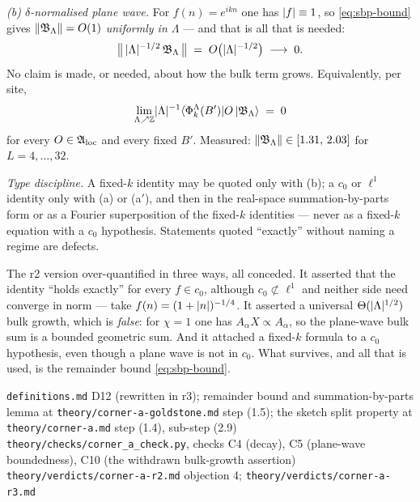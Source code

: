 \begin{definition}
\emph{(b) $\delta$-normalised plane wave.} For $f(n) = e^{ikn}$ one has
$\lvert f\rvert \equiv 1$, so \eqref{eq:sbp-bound} gives
$\Vert \mathfrak{B}_{\Lambda} \Vert = O(1)$ \emph{uniformly in $\Lambda$} --- and
that is all that is needed:
\begin{equation}
  \bigl\Vert \, \lvert \Lambda\rvert^{-1/2} \, \mathfrak{B}_{\Lambda} \, \bigr\Vert
  \;=\; O\bigl(\lvert \Lambda\rvert^{-1/2}\bigr) \;\longrightarrow\; 0 .
\end{equation}
No claim is made, or needed, about how the bulk term grows. Equivalently, per
site,
\begin{equation}
  \lim_{\Lambda \nearrow \mathbb{Z}} \lvert \Lambda\rvert^{-1}
  \langle \Phi_{k}^{\Lambda}(B')| O \, |\mathfrak{B}_{\Lambda}\rangle \;=\; 0
\end{equation}
for every $O \in \mathfrak{A}_{\mathrm{loc}}$ and every fixed $B'$. Measured:
$\Vert \mathfrak{B}_{\Lambda} \Vert \in [1.31,\, 2.03]$ for
$L = 4, \ldots, 32$.

\emph{Type discipline.} A fixed-$k$ identity may be quoted only with (b); a
$c_{0}$ or $\ell^{1}$ identity only with (a) or (a$'$), and then in the
real-space summation-by-parts form or as a Fourier superposition of the
fixed-$k$ identities --- never as a fixed-$k$ equation with a $c_{0}$
hypothesis. Statements quoted ``exactly'' without naming a regime are
defects.
\end{definition}

\begin{remark}
The r2 version over-quantified in three ways, all conceded. It asserted that
the identity ``holds exactly'' for every $f \in c_{0}$, although
$c_{0} \not\subset \ell^{1}$ and neither side need converge in norm --- take
$f(n) = (1+\lvert n\rvert)^{-1/4}$. It asserted a universal $\Theta(\lvert \Lambda\rvert^{1/2})$
bulk growth, which is \emph{false}: for $\chi = 1$ one has
$A_{\alpha} X \propto A_{\alpha}$, so the plane-wave bulk sum is a bounded
geometric sum. And it attached a fixed-$k$ formula to a $c_{0}$ hypothesis,
even though a plane wave is not in $c_{0}$. What survives, and all that is
used, is the remainder bound \eqref{eq:sbp-bound}.
\end{remark}

%
{\texttt{definitions.md} D12 (rewritten in r3); remainder bound and
 summation-by-parts lemma at \texttt{theory/corner-a-goldstone.md} step (1.5);
 the sketch split property at \texttt{theory/corner-a.md} step (1.4),
 sub-step (2.9)}%
{\texttt{theory/checks/corner\_a\_check.py}, checks C4 (decay), C5 (plane-wave
 boundedness), C10 (the withdrawn bulk-growth assertion)}%
{\texttt{theory/verdicts/corner-a-r2.md} objection 4;
 \texttt{theory/verdicts/corner-a-r3.md}}
